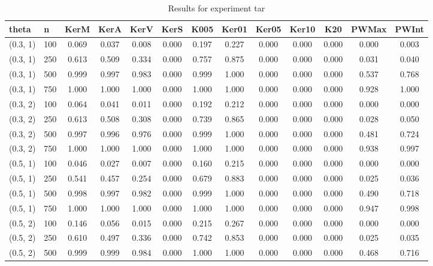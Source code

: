   \begin{table}[ht]
	\centering
	
	\caption{Results for experiment tar}
	\tiny{
		\begin{tabular}{ll|ccccccccccc}
			\hline
			theta & n & KerM & KerA & KerV & KerS & K005 & Ker01 & Ker05 & Ker10 & K20 & PWMax & PWInt \\
			\hline
			(0.3, 1) & 100 & 0.069 & 0.037 & 0.008 & 0.000 & 0.197 & 0.227 & 0.000 & 0.000 & 0.000 & 0.000 & 0.003 \\
			(0.3, 1) & 250 & 0.613 & 0.509 & 0.334 & 0.000 & 0.757 & 0.875 & 0.000 & 0.000 & 0.000 & 0.031 & 0.040 \\
			(0.3, 1) & 500 & 0.999 & 0.997 & 0.983 & 0.000 & 0.999 & 1.000 & 0.000 & 0.000 & 0.000 & 0.537 & 0.768 \\
			(0.3, 1) & 750 & 1.000 & 1.000 & 1.000 & 0.000 & 1.000 & 1.000 & 0.000 & 0.000 & 0.000 & 0.928 & 1.000 \\
			(0.3, 2) & 100 & 0.064 & 0.041 & 0.011 & 0.000 & 0.192 & 0.212 & 0.000 & 0.000 & 0.000 & 0.000 & 0.000 \\
			(0.3, 2) & 250 & 0.613 & 0.508 & 0.308 & 0.000 & 0.739 & 0.865 & 0.000 & 0.000 & 0.000 & 0.028 & 0.050 \\
			(0.3, 2) & 500 & 0.997 & 0.996 & 0.976 & 0.000 & 0.999 & 1.000 & 0.000 & 0.000 & 0.000 & 0.481 & 0.724 \\
			(0.3, 2) & 750 & 1.000 & 1.000 & 1.000 & 0.000 & 1.000 & 1.000 & 0.000 & 0.000 & 0.000 & 0.938 & 0.997 \\
			(0.5, 1) & 100 & 0.046 & 0.027 & 0.007 & 0.000 & 0.160 & 0.215 & 0.000 & 0.000 & 0.000 & 0.000 & 0.000 \\
			(0.5, 1) & 250 & 0.541 & 0.457 & 0.254 & 0.000 & 0.679 & 0.883 & 0.000 & 0.000 & 0.000 & 0.025 & 0.036 \\
			(0.5, 1) & 500 & 0.998 & 0.997 & 0.982 & 0.000 & 0.999 & 1.000 & 0.000 & 0.000 & 0.000 & 0.490 & 0.718 \\
			(0.5, 1) & 750 & 1.000 & 1.000 & 1.000 & 0.000 & 1.000 & 1.000 & 0.000 & 0.000 & 0.000 & 0.947 & 0.998 \\
			(0.5, 2) & 100 & 0.146 & 0.056 & 0.015 & 0.000 & 0.215 & 0.267 & 0.000 & 0.000 & 0.000 & 0.000 & 0.000 \\
			(0.5, 2) & 250 & 0.610 & 0.497 & 0.336 & 0.000 & 0.742 & 0.853 & 0.000 & 0.000 & 0.000 & 0.025 & 0.035 \\
			(0.5, 2) & 500 & 0.999 & 0.999 & 0.984 & 0.000 & 1.000 & 1.000 & 0.000 & 0.000 & 0.000 & 0.468 & 0.716 \\

\end{tabular}}
\end{table}
